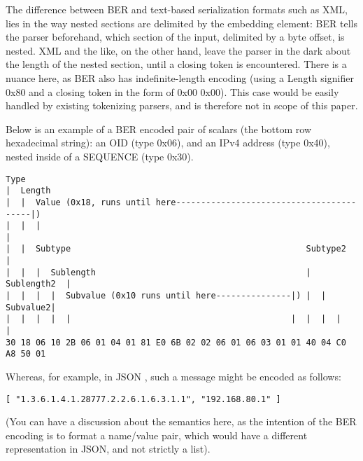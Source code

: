 The difference between BER and text-based serialization formats such as 
XML, lies in the way nested sections are delimited by the embedding 
element: BER tells the parser beforehand, which section of the input, 
delimited by a byte offset, is nested. XML and the like, on the other 
hand, leave the parser in the dark about the length of the nested section, 
until a closing token is encountered. There is a nuance here, as BER
also has indefinite-length encoding (using a Length signifier 0x80 and
a closing token in the form of 0x00 0x00). This case would be easily
handled by existing tokenizing parsers, and is therefore not in scope of
this paper.

Below is an example of a BER encoded pair of scalars
(the bottom row hexadecimal string): an
OID (type 0x06), and an IPv4 address (type 0x40), nested inside of
a SEQUENCE (type 0x30).

\begin{changemargin}{-60mm}{0mm}
\begin{myquote}
\begin{verbatim}
Type
|  Length
|  |  Value (0x18, runs until here-----------------------------------------|)
|  |  |                                                                    |
|  |  Subtype                                               Subtype2       |
|  |  |  Sublength                                          |  Sublength2  |
|  |  |  |  Subvalue (0x10 runs until here---------------|) |  |  Subvalue2|
|  |  |  |  |                                            |  |  |  |        |
30 18 06 10 2B 06 01 04 01 81 E0 6B 02 02 06 01 06 03 01 01 40 04 C0 A8 50 01
\end{verbatim}
\end{myquote}
\end{changemargin}

Whereas, for example, in JSON \cite{bib:json},
such a message might be encoded as follows:

\begin{changemargin}{-60mm}{0mm}
\begin{myquote}
\begin{verbatim}
[ "1.3.6.1.4.1.28777.2.2.6.1.6.3.1.1", "192.168.80.1" ]
\end{verbatim}
\end{myquote}
\end{changemargin}

(You can have a discussion about the semantics here, as the intention of
the BER encoding is to format a name/value pair, which would have a
different representation in JSON, and not strictly a list).

